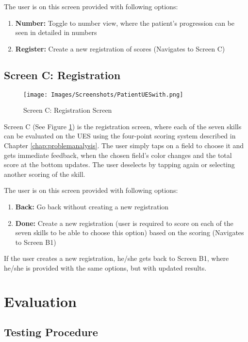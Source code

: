 The user is on this screen provided with following options: 
\begin{enumerate}
\item \textbf{Number:} Toggle to number view, where the patient's progression can be seen in detailed in numbers
\item \textbf{Register:} Create a new registration of scores (Navigates to Screen C)
\end{enumerate}  \newpage


\subsection*{Screen C: Registration}
\begin{figure}[H] \centering
			\texttt{[image: Images/Screenshots/PatientUESwith.png]}
		\caption{Screen C: Registration Screen} \label{fig:screenC}
\end{figure}


Screen C (See Figure \ref{fig:screenC}) is the registration screen, where each of the seven skills can be evaluated on the UES using the four-point scoring system described in Chapter \ref{chap:problemanalysis}. The user simply taps on a field to choose it and gets immediate feedback, when the chosen field's color changes and the total score at the bottom updates. The user deselects by tapping again or selecting another scoring of the skill. 

The user is on this screen provided with following options: 
\begin{enumerate}
\item \textbf{Back:} Go back without creating a new registration 
\item \textbf{Done:} Create a new registration (user is required to score on each of the seven skills to be able to choose this option) based on the scoring (Navigates to Screen B1)
\end{enumerate}

If the user creates a new registration, he/she gets back to Screen B1, where he/she is provided with the same options, but with updated results. \newpage





\section{Evaluation}

\subsection{Testing Procedure}

